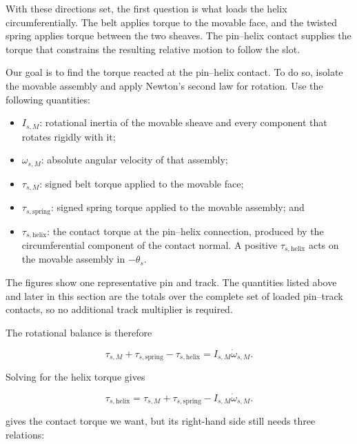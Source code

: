 \documentclass[11pt]{report}
\numberwithin{equation}{section}
\begin{document}
With these directions set, the first question is what loads the helix
circumferentially. The belt applies torque to the movable face, and the
twisted spring applies torque between the two sheaves. The pin--helix contact
supplies the torque that constrains the resulting relative motion to follow
the slot.

Our goal is to find the torque reacted at the pin--helix contact. To do so,
isolate the movable assembly and apply Newton's second law for rotation. Use
the following quantities:

\begin{itemize}
    \item \(I_{s,M}\): rotational inertia of the movable sheave and every
    component that rotates rigidly with it;
    \item \(\omega_{s,M}\): absolute angular velocity of that assembly;
    \item \(\tau_{s,M}\): signed belt torque applied to the movable face;
    \item \(\tau_{s,\mathrm{spring}}\): signed spring torque applied to the
    movable assembly; and
    \item \(\tau_{s,\mathrm{helix}}\): the contact torque at the pin--helix
    connection, produced by the circumferential component of the contact
    normal. A positive \(\tau_{s,\mathrm{helix}}\) acts on the movable
    assembly in \(-\theta_s\).
\end{itemize}

The figures show one representative pin and track. The quantities
listed above and later in this section are the
totals over the complete set of loaded pin--track contacts, so no additional
track multiplier is required.

The rotational balance is therefore

\begin{equation}
    \tau_{s,M}
    +\tau_{s,\mathrm{spring}}
    -\tau_{s,\mathrm{helix}}
    =
    I_{s,M}\dot\omega_{s,M}.
    \label{eq:secondary_movable_sheave_torque_balance}
\end{equation}

Solving for the helix torque gives

\begin{equation}
    \tau_{s,\mathrm{helix}}
    =
    \tau_{s,M}
    +\tau_{s,\mathrm{spring}}
    -I_{s,M}\dot\omega_{s,M}.
    \label{eq:secondary_reacted_helix_torque_structure}
\end{equation}

 gives the contact torque we
want, but its right-hand side still needs three relations:
\end{document}
